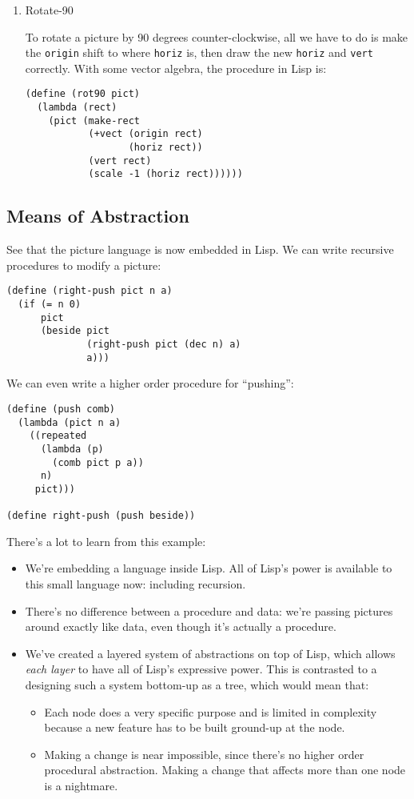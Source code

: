 \documentclass[9pt]{report}
\begin{document}
\begin{enumerate}
\item Rotate-90
\label{sec:org6cd04f0}

To rotate a picture by 90 degrees counter-clockwise, all we have
to do is make the \texttt{origin} shift to where \texttt{horiz} is, then draw
the new \texttt{horiz} and \texttt{vert} correctly. With some vector algebra,
the procedure in Lisp is:

\begin{verbatim}
(define (rot90 pict)
  (lambda (rect)
    (pict (make-rect
           (+vect (origin rect)
                  (horiz rect))
           (vert rect)
           (scale -1 (horiz rect))))))
\end{verbatim}
\end{enumerate}


\subsection{Means of Abstraction}
\label{sec:orgdce0f3a}
See that the picture language is now embedded in Lisp. We can
write recursive procedures to modify a picture:

\begin{verbatim}
(define (right-push pict n a)
  (if (= n 0)
      pict
      (beside pict
              (right-push pict (dec n) a)
              a)))
\end{verbatim}

We can even write a higher order procedure for ``pushing'':
\begin{verbatim}
(define (push comb)
  (lambda (pict n a)
    ((repeated
      (lambda (p)
        (comb pict p a))
      n)
     pict)))

(define right-push (push beside))
\end{verbatim}

There's a lot to learn from this example:
\begin{itemize}
\item We're embedding a language inside Lisp. All of Lisp's power is
available to this small language now: including recursion.
\item There's no difference between a procedure and data: we're
passing pictures around exactly like data, even though it's
actually a procedure.
\item We've created a layered system of abstractions on top of Lisp,
which allows \emph{each layer} to have all of Lisp's expressive
power. This is contrasted to a designing such a system bottom-up
as a tree, which would mean that:
\begin{itemize}
\item Each node does a very specific purpose and is limited in
complexity because a new feature has to be built ground-up at
the node.
\item Making a change is near impossible, since there's no higher
order procedural abstraction. Making a change that affects
more than one node is a nightmare.
\end{itemize}
\end{itemize}
\end{document}
